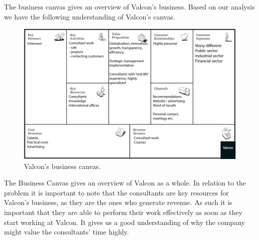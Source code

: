 The business canvas gives an overview of Valcon's business.
Based on our analysis we have the following understanding of Valcon's canvas.
\begin{figure}[!htp]
\includegraphics[width=\textwidth]{inline/business-model-canvas.png}
\caption{Valcon's business canvas.}
\label{fig:canvas}
\end{figure}

The Business Canvas gives an overview of Valcon as a whole. In relation to the problem it is important to note that the consultants are key resources for Valcon's business, as they are the ones who generate revenue.
As such it is important that they are able to perform their work effectively as soon as they start working at Valcon. It gives us a good understanding of why the company might value the consultants' time highly.